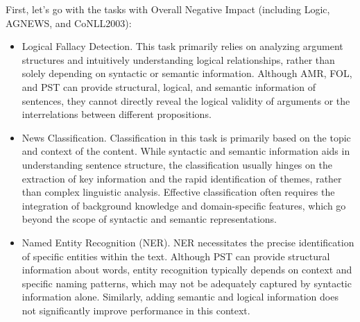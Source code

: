 First, let's go with the tasks with Overall Negative Impact (including Logic, AGNEWS, and CoNLL2003):
\begin{itemize}
  \item Logical Fallacy Detection. This task primarily relies on analyzing argument structures and intuitively understanding logical relationships, rather than solely depending on syntactic or semantic information. Although AMR, FOL, and PST can provide structural, logical, and semantic information of sentences, they cannot directly reveal the logical validity of arguments or the interrelations between different propositions.
  \item News Classification. Classification in this task is primarily based on the topic and context of the content. While syntactic and semantic information aids in understanding sentence structure, the classification usually hinges on the extraction of key information and the rapid identification of themes, rather than complex linguistic analysis. Effective classification often requires the integration of background knowledge and domain-specific features, which go beyond the scope of syntactic and semantic representations.
  \item Named Entity Recognition (NER). NER necessitates the precise identification of specific entities within the text. Although PST can provide structural information about words, entity recognition typically depends on context and specific naming patterns, which may not be adequately captured by syntactic information alone. Similarly, adding semantic and logical information does not significantly improve performance in this context.
\end{itemize}

